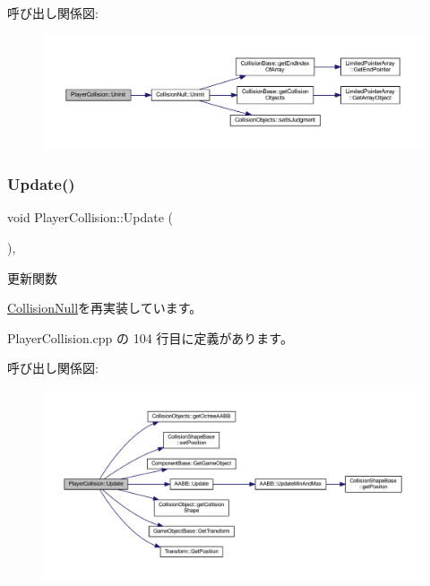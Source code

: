 呼び出し関係図\+:\nopagebreak
\begin{figure}[H]
\begin{center}
\leavevmode
\includegraphics[width=350pt]{class_player_collision_aa1ab60a62fa2ae3231a1ea0bc8faf801_cgraph}
\end{center}
\end{figure}
\mbox{\label{class_player_collision_a09f97f220903f5724a3af6b97af3a336}} 
\subsubsection{\texorpdfstring{Update()}{Update()}}
{\footnotesize\ttfamily void Player\+Collision\+::\+Update (\begin{DoxyParamCaption}{ }\end{DoxyParamCaption})\hspace{0.3cm}{\ttfamily [override]}, {\ttfamily [virtual]}}



更新関数 



\mbox{\hyperlink{class_collision_null_a5e5e094e3fbe3ccc0515e485c739bd15}{Collision\+Null}}を再実装しています。



 Player\+Collision.\+cpp の 104 行目に定義があります。

呼び出し関係図\+:\nopagebreak
\begin{figure}[H]
\begin{center}
\leavevmode
\includegraphics[width=350pt]{class_player_collision_a09f97f220903f5724a3af6b97af3a336_cgraph}
\end{center}
\end{figure}


